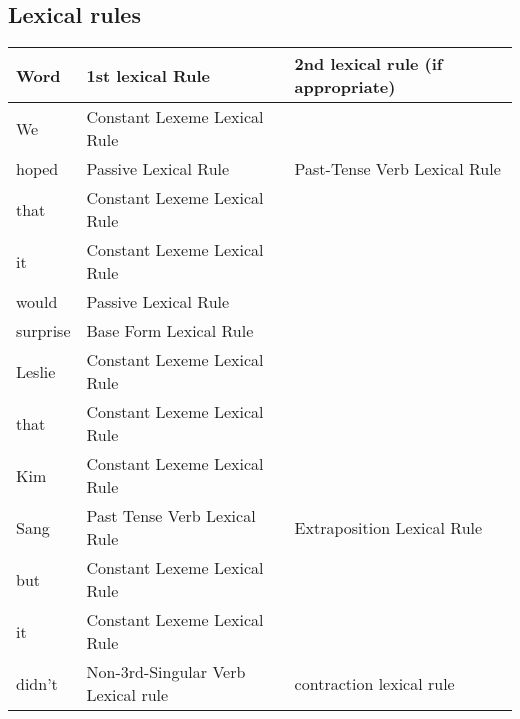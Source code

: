 \documentclass[12pt]{article}
\begin{document}
\subsection{Lexical rules}
\begin{longtable}{|l|l|l|}
\hline
Word & 1st lexical Rule & 2nd lexical rule (if appropriate)  \\ \hline
We & Constant Lexeme Lexical Rule &\\ \hline
hoped & Passive Lexical Rule & Past-Tense Verb Lexical Rule \\ \hline
that & Constant Lexeme Lexical Rule & \\ \hline
it & Constant Lexeme Lexical Rule & \\ \hline
would & Passive Lexical Rule & \\ \hline
surprise & Base Form Lexical Rule & \\ \hline
Leslie & Constant Lexeme Lexical Rule& \\ \hline
that &Constant Lexeme Lexical Rule & \\ \hline
Kim &Constant Lexeme Lexical Rule & \\ \hline
Sang & Past Tense Verb Lexical Rule & Extraposition Lexical Rule \\ \hline
but & Constant Lexeme Lexical Rule & \\ \hline
it &  Constant Lexeme Lexical Rule& \\ \hline
didn't & Non-3rd-Singular Verb Lexical rule & contraction lexical rule \\ \hline
\end{longtable}
\end{document}
